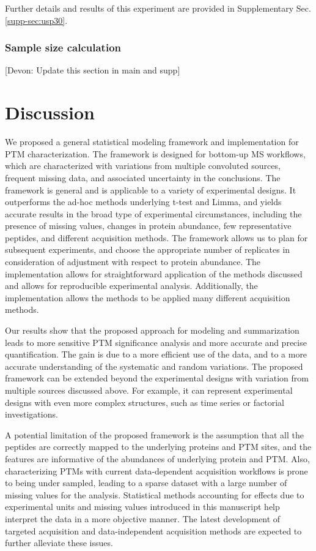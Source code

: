 \documentclass[mcp]{article}
\numberwithin{figure}{section} %
\numberwithin{table}{section}
\def\todo#1{{\color{red}[#1]}}
\begin{document}
Further details and results of this experiment are provided in Supplementary Sec. \ref{supp-sec:usp30}. 

\subsubsection*{Sample size calculation}

\todo{Devon: Update this section in main and supp}

\section{Discussion}

We proposed a general statistical modeling framework and implementation for PTM characterization. The framework is designed for bottom-up MS workflows, which are characterized with variations from multiple convoluted sources, frequent missing data, and associated uncertainty in the conclusions. The framework is general and is applicable to a variety of experimental designs. It outperforms the ad-hoc methods underlying t-test and Limma, and yields accurate results in the broad type of experimental circumstances, including the presence of missing values, changes in protein abundance, few representative peptides, and different acquisition methods. The framework allows us to plan for subsequent experiments, and choose the appropriate number of replicates in consideration of adjustment with respect to protein abundance. The implementation allows for straightforward application of the methods discussed and allows for reproducible experimental analysis. Additionally, the implementation allows the methods to be applied many different acquisition methods. 

Our results show that the proposed approach for modeling and summarization  leads to more sensitive PTM significance analysis and more accurate and precise quantification. The gain is due to a more efficient use of the data, and to a more accurate understanding of the systematic and random variations. The proposed framework can be extended beyond the experimental designs with variation from multiple sources discussed above. For example, it can represent experimental designs with even more complex structures, such as time series or factorial investigations. 

A potential limitation of the proposed framework is the assumption that all the peptides are correctly mapped to the underlying proteins and PTM sites, and the features are informative of the abundances of underlying protein and PTM. Also, characterizing PTMs with current data-dependent acquisition workflows is prone to being under sampled, leading to a sparse dataset with a large number of missing values for the analysis. Statistical methods accounting for effects due to experimental units and missing values introduced in this manuscript help interpret the data in a more objective manner. The latest development of targeted acquisition and data-independent acquisition methods are expected to further alleviate these issues. 
\end{document}
